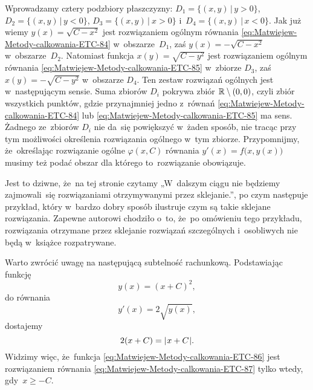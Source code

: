 \documentclass[a4paper,11pt]{article}
\numberwithin{equation}{section}
\begin{document}
Wprowadzamy cztery podzbiory płaszczyzny:
$D_{ 1 } = \{ ( x, y ) \, | \, y > 0 \}$,
$D_{ 2 } = \{ ( x, y ) \, | \, y < 0 \}$,
$D_{ 3 } = \{ ( x, y ) \, | \ x > 0 \}$
i~$D_{ 4 } = \{ ( x, y ) \, | \, x < 0 \}$. Jak już wiemy
$y( x ) = \sqrt{ C - x^{ 2 } }$ jest rozwiązaniem ogólnym równania
\eqref{eq:Matwiejew-Metody-calkowania-ETC-84} w~obszarze~$D_{ 1 }$, zaś
$y( x ) = -\sqrt{ C - x^{ 2 } }$ w~obszarze~$D_{ 2 }$. Natomiast funkcja
$x( y ) = \sqrt{ C - y^{ 2 } }$ jest rozwiązaniem ogólnym równania
\eqref{eq:Matwiejew-Metody-calkowania-ETC-85} w~zbiorze $D_{ 3 }$, zaś
$x( y ) = -\sqrt{ C - y^{ 2 } }$ w~obszarze $D_{ 4 }$. Ten zestaw rozwiązań
ogólnych jest w~następującym sensie. Suma zbiorów $D_{ i }$ pokrywa zbiór
$\mathbb{R} \setminus { ( 0, 0 ) }$, czyli zbiór wszystkich punktów, gdzie przynajmniej
jedno z~równań \eqref{eq:Matwiejew-Metody-calkowania-ETC-84} lub
\eqref{eq:Matwiejew-Metody-calkowania-ETC-85} ma sens. Żadnego ze~zbiorów
$D_{ i }$ nie da~się powiększyć w~żaden sposób, nie tracąc przy tym
możliwości określenia rozwiązania ogólnego w~tym zbiorze. Przypomnijmy,
że~określając rozwiązanie ogólne $\varphi( x, C )$ równania
$y'( x ) = f\big( x, y( x ) \big)$ musimy też podać obszar dla którego
to~rozwiązanie obowiązuje.

\VerSpaceFour





\noindent
{} Jest to dziwne, że~na tej stronie czytamy „W~dalszym ciągu nie
będziemy zajmowali~się rozwiązaniami otrzymywanymi przez sklejanie.”, po
czym następuje przykład, który w~bardzo dobry sposób ilustruje czym są
takie sklejane rozwiązania. Zapewne autorowi chodziło o~to, że~po omówieniu
tego przykładu, rozwiązania otrzymane przez sklejanie rozwiązań szczególnych
i~osobliwych nie będą w~książce rozpatrywane.

\VerSpaceFour





\noindent
{} Warto zwrócić uwagę na następującą subtelność rachunkową.
Podstawiając funkcję
\begin{equation}
  \label{eq:Matwiejew-Metody-calkowania-ETC-86}
  y( x ) = ( x + C )^{ 2 },
\end{equation}
do równania
\begin{equation}
  \label{eq:Matwiejew-Metody-calkowania-ETC-87}
  y'( x ) = 2 \sqrt{ y( x ) },
\end{equation}
dostajemy
\begin{equation}
  \label{eq:Matwiejew-Metody-calkowania-ETC-88}
  2 ( x + C ) = | \hspace{0.05em}  x + C  \hspace{0.05em} |.
\end{equation}
Widzimy więc, że~funkcja \eqref{eq:Matwiejew-Metody-calkowania-ETC-86}
jest rozwiązaniem równania \eqref{eq:Matwiejew-Metody-calkowania-ETC-87}
tylko wtedy, gdy~$x \geq -C$.
\end{document}
